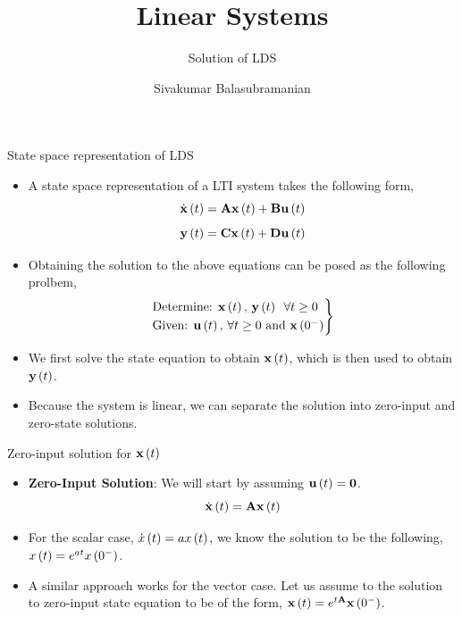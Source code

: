 \documentclass[aspectratio=169]{beamer}
\title{Linear Systems}
\subtitle{Solution of LDS}
\author{Sivakumar Balasubramanian}
\institute[Christian Medical College] %
{
  \inst{}%
  Department of Bioengineering\\
  Christian Medical College, Bagayam\\
  Vellore 632002
}
\date{}
\def\mf{\ensuremath\mathbf}
\def\lp{\ensuremath\left(}
\def\rp{\ensuremath\right)}
\newcommand{\ct}[1]{\lp #1\rp}
\begin{document}

\begin{frame}
  \titlepage
\end{frame}


\begin{frame}[t]{State space representation of LDS}
\begin{itemize}
    \item A state space representation of a LTI system takes the following form,
    \[ \dot{\mf{x}}\ct{t} = \mf{A}\mf{x}\ct{t} + \mf{B}\mf{u}\ct{t} \]
    \[ \mf{y}\ct{t} = \mf{C}\mf{x}\ct{t} + \mf{D}\mf{u}\ct{t} \]

    \item Obtaining the solution to the above equations can be posed as the following prolbem,
    \[ \begin{rcases}
    \text{Determine:  }  \mf{x}\ct{t}, \, \mf{y}\ct{t} \,\,\, \forall t \geq 0 \\
    \text{Given:  }  \mf{u}\ct{t}, \, \forall t \geq 0 \text{ and } \mf{x}\ct{0^{-}} \\
    \end{rcases}
    \]

    \item We first solve the state equation to obtain $\mf{x}\ct{t}$, which is then used to obtain $\mf{y}\ct{t}$.

    \item Because the system is linear, we can separate the solution into zero-input and zero-state solutions.
\end{itemize}
\end{frame}


\begin{frame}[t]{Zero-input solution for $\mf{x}\ct{t}$}
\begin{itemize}
    \item \textbf{Zero-Input Solution}: We will start by assuming $\mf{u}\ct{t} = \mf{0}$.
    \[ \dot{\mf{x}}\ct{t} = \mf{A}\mf{x}\ct{t} \]

    \item For the scalar case, $\dot{x}\ct{t} = ax\ct{t}$, we know the solution to be the following, $x\ct{t} = e^{at}x\ct{0^-}$.

    \item A similar approach works for the vector case. Let us assume to the solution to zero-input state equation to be of the form, $\mf{x}\ct{t} = e^{t\mf{A}}\mf{x}\ct{0^-}$. 
\end{itemize}
\end{frame}
\end{document}
